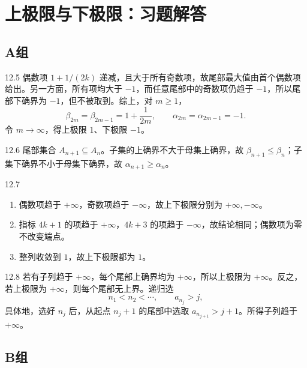 \chapter{上极限与下极限：习题解答}

\section*{A组}

\begin{solution}{12.5}
偶数项 \(1+1/(2k)\) 递减，且大于所有奇数项，故尾部最大值由首个偶数项给出。另一方面，所有项均大于 \(-1\)，而任意尾部中的奇数项仍趋于 \(-1\)，所以尾部下确界为 \(-1\)，但不被取到。综上，对 \(m\ge1\)，
\[
 \beta_{2m}=\beta_{2m-1}=1+\frac1{2m},\qquad
 \alpha_{2m}=\alpha_{2m-1}=-1.
\]
令 \(m\to\infty\)，得上极限 \(1\)、下极限 \(-1\)。
\end{solution}

\begin{solution}{12.6}
尾部集合 \(A_{n+1}\subseteq A_n\)。子集的上确界不大于母集上确界，故 \(\beta_{n+1}\le\beta_n\)；子集下确界不小于母集下确界，故 \(\alpha_{n+1}\ge\alpha_n\)。
\end{solution}

\begin{solution}{12.7}
\begin{enumerate}[label=(\arabic*)]
 \item 偶数项趋于 \(+\infty\)，奇数项趋于 \(-\infty\)，故上下极限分别为 \(+\infty,-\infty\)。
 \item 指标 \(4k+1\) 的项趋于 \(+\infty\)，\(4k+3\) 的项趋于 \(-\infty\)，故结论相同；偶数项为零不改变端点。
 \item 整列收敛到 \(1\)，故上下极限都为 \(1\)。
\end{enumerate}
\end{solution}

\begin{solution}{12.8}
若有子列趋于 \(+\infty\)，每个尾部上确界均为 \(+\infty\)，所以上极限为 \(+\infty\)。反之，若上极限为 \(+\infty\)，则每个尾部无上界。递归选
\[
 n_1<n_2<\cdots,\qquad a_{n_j}>j,
\]
具体地，选好 \(n_j\) 后，从起点 \(n_j+1\) 的尾部中选取
\(a_{n_{j+1}}>j+1\)。所得子列趋于 \(+\infty\)。
\end{solution}

\section*{B组}

